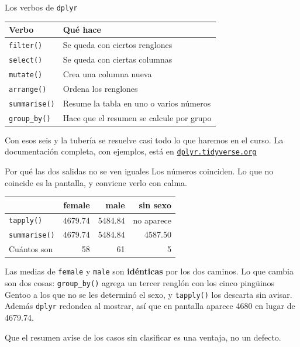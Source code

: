 \documentclass[aspectratio=169,10pt]{beamer}
\newcommand{\Rc}[1]{{\setlength{\fboxsep}{1.6pt}%
  \colorbox{codigoFondo}{\textcolor{codigoTexto}{\texttt{#1}}}}}
\newcommand{\destaca}[1]{%
  \par\vspace{3pt}\noindent
  \colorbox{azulClaro}{%
    \parbox{\dimexpr\linewidth-2\fboxsep\relax}{\vspace{3pt}#1\vspace{3pt}}}%
  \par\vspace{3pt}}
\begin{document}
\begin{frame}{Los verbos de \texttt{dplyr}}
  \begin{center}
  {\small
  \begin{tabular}{@{}p{3.4cm}p{8.4cm}@{}}
    \toprule
    \textbf{Verbo} & \textbf{Qué hace} \\
    \midrule
    \Rc{filter()}    & Se queda con ciertos renglones \\
    \Rc{select()}    & Se queda con ciertas columnas \\
    \Rc{mutate()}    & Crea una columna nueva \\
    \Rc{arrange()}   & Ordena los renglones \\
    \Rc{summarise()} & Resume la tabla en uno o varios números \\
    \Rc{group\_by()} & Hace que el resumen se calcule por grupo \\
    \bottomrule
  \end{tabular}}
  \end{center}

  \vspace{0.4cm}
  \destaca{Con esos seis y la tubería se resuelve casi todo lo que haremos en el curso.
  La documentación completa, con ejemplos, está en
  \href{https://dplyr.tidyverse.org/}{\texttt{dplyr.tidyverse.org}}}
\end{frame}
\begin{frame}{Por qué las dos salidas no se ven iguales}
  Los números coinciden. Lo que no coincide es la pantalla, y conviene verlo con calma.

  \vspace{0.3cm}
  \begin{center}
  {\small
  \begin{tabular}{@{}lrrr@{}}
    \toprule
    & \textbf{female} & \textbf{male} & \textbf{sin sexo} \\
    \midrule
    \Rc{tapply()}     & 4679.74 & 5484.84 & \textcolor{rojoAc}{no aparece} \\
    \Rc{summarise()}  & 4679.74 & 5484.84 & 4587.50 \\
    \midrule
    Cuántos son       & 58 & 61 & 5 \\
    \bottomrule
  \end{tabular}}
  \end{center}

  \vspace{0.35cm}
  \destaca{\small Las medias de \texttt{female} y \texttt{male} son \textbf{idénticas}
  por los dos caminos. Lo que cambia son dos cosas:
  \Rc{group\_by()} agrega un tercer renglón con los cinco pingüinos Gentoo a los que no
  se les determinó el sexo, y \Rc{tapply()} los descarta sin avisar. Además
  \texttt{dplyr} redondea al mostrar, así que en pantalla aparece 4680 en lugar de
  4679.74.

  \vspace{0.15cm}
  Que el resumen avise de los casos sin clasificar es una ventaja, no un defecto.}
\end{frame}
\end{document}
